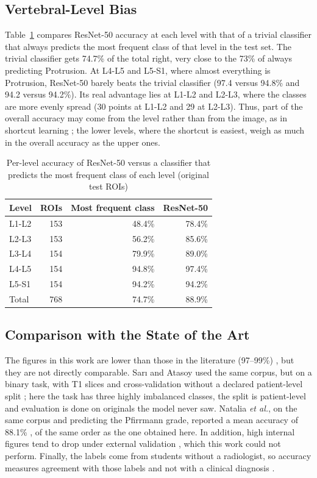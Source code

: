 \subsection{Vertebral-Level Bias}
\label{sec:res_level}
Table~\ref{tab:levelres} compares ResNet-50 accuracy at each level with that of a trivial classifier that always predicts the most frequent class of that level in the test set. The trivial classifier gets 74.7\% of the total right, very close to the 73\% of always predicting Protrusion. At L4-L5 and L5-S1, where almost everything is Protrusion, ResNet-50 barely beats the trivial classifier (97.4 versus 94.8\% and 94.2 versus 94.2\%). Its real advantage lies at L1-L2 and L2-L3, where the classes are more evenly spread (30 points at L1-L2 and 29 at L2-L3). Thus, part of the overall accuracy may come from the level rather than from the image, as in shortcut learning \cite{onglt2024}; the lower levels, where the shortcut is easiest, weigh as much in the overall accuracy as the upper ones.

\begin{table}[!htb]
\centering\footnotesize
\caption{Per-level accuracy of ResNet-50 versus a classifier that predicts the most frequent class of each level (original test ROIs)}
\label{tab:levelres}
\begin{tabular}{lrrr}
\toprule
Level & ROIs & Most frequent class & ResNet-50 \\
\midrule
L1-L2 & 153 & 48.4\% & 78.4\% \\
L2-L3 & 153 & 56.2\% & 85.6\% \\
L3-L4 & 154 & 79.9\% & 89.0\% \\
L4-L5 & 154 & 94.8\% & 97.4\% \\
L5-S1 & 154 & 94.2\% & 94.2\% \\
\midrule
Total & 768 & 74.7\% & 88.9\% \\
\bottomrule
\end{tabular}
\end{table}

\subsection{Comparison with the State of the Art}
\label{sec:res_sota}
The figures in this work are lower than those in the literature (97--99\%) \cite{sari2025,liawrungrueang2023}, but they are not directly comparable. Sar{\i} and Atasoy used the same corpus, but on a binary task, with T1 slices and cross-validation without a declared patient-level split \cite{sari2025}; here the task has three highly imbalanced classes, the split is patient-level and evaluation is done on originals the model never saw. Natalia \emph{et al.}, on the same corpus and predicting the Pfirrmann grade, reported a mean accuracy of 88.1\% \cite{natalia2024}, of the same order as the one obtained here. In addition, high internal figures tend to drop under external validation \cite{yi2023,nigru2024}, which this work could not perform. Finally, the labels come from students without a radiologist, so accuracy measures agreement with those labels and not with a clinical diagnosis \cite{shi2024}.
